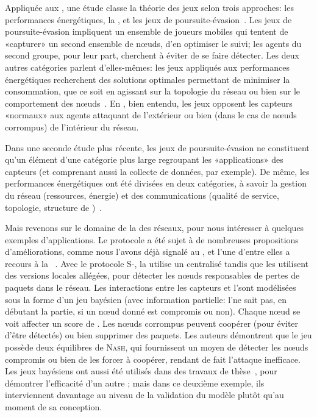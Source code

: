 Appliquée aux \rcs, une étude classe la théorie des jeux selon trois approches: les performances énergétiques, la \secu, et les jeux de poursuite-évasion~\cite{MT08}.
Les jeux de poursuite-évasion impliquent un ensemble de joueurs mobiles qui tentent de «capturer» un second ensemble de nœuds, d'en optimiser le suivi; les agents du second groupe, pour leur part, cherchent à éviter de se faire détecter.
Les deux autres catégories parlent d'elles-mêmes: les jeux appliqués aux performances énergétiques recherchent des solutions optimales permettant de minimiser la consommation, que ce soit en agissant sur la topologie du réseau ou bien sur le comportement des nœuds~\cite{CPF09}.
En \secu, bien entendu, les jeux opposent les capteurs «normaux» aux agents attaquant de l'extérieur ou bien (dans le cas de nœuds corrompus) de l'intérieur du réseau.

Dans une seconde étude plus récente, les jeux de poursuite-évasion ne constituent qu'un élément d'une catégorie plus large regroupant les «applications» des capteurs (et comprenant aussi la collecte de données, par exemple).
De même, les performances énergétiques ont été divisées en deux catégories, à savoir la gestion du réseau (ressources, énergie) et des communications (qualité de service, topologie, structure de )~\cite{SWKC12}.

Mais revenons sur le domaine de la \secu des réseaux, pour nous intéresser à quelques exemples d'applications.
Le protocole \leach a été sujet à de nombreuses propositions d'améliorations, comme nous l'avons déjà signalé au , et l'une d'entre elles a recours à la ~\cite{MMZ09}.
Avec le protocole S-\leach, la \sdb utilise un \ids centralisé tandis que les \chs utilisent des versions locales allégées, pour détecter les nœuds responsables de pertes de paquets dans le réseau.
Les interactions entre les capteurs et l'\IDS sont modélisées sous la forme d'un jeu bayésien (\cad avec information partielle: l'\IDS ne sait pas, en débutant la partie, si un nœud donné est compromis ou non).
Chaque nœud se voit affecter un score de \reput.
Les nœuds corrompus peuvent coopérer (pour éviter d'être détectés) ou bien supprimer des paquets.
Les auteurs démontrent que le jeu possède deux équilibres de \textsc{Nash}, qui fournissent un moyen de détecter les nœuds compromis ou bien de les forcer à coopérer, rendant de fait l'attaque inefficace.
Les jeux bayésiens ont aussi été utilisés dans des travaux de thèse~\cite{Ham12}, pour démontrer l'efficacité d'un autre \ids; mais dans ce deuxième exemple, ils interviennent davantage au niveau de la validation \aposteriori du modèle plutôt qu'au moment de sa conception.

